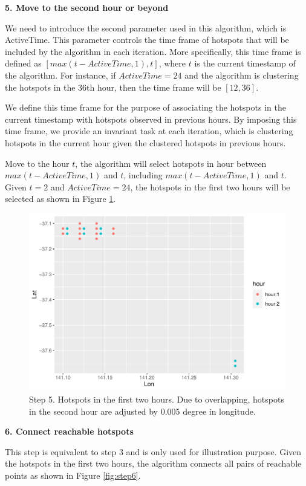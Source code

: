 \textbf{5. Move to the second hour or beyond}

We need to introduce the second parameter used in this algorithm, which
is ActiveTime. This parameter controls the time frame of hotspots that
will be included by the algorithm in each iteration. More specifically,
this time frame is defined as \([max(t-ActiveTime,1),t]\), where \(t\)
is the current timestamp of the algorithm. For instance, if
\(ActiveTime = 24\) and the algorithm is clustering the hotspots in the
36th hour, then the time frame will be \([12,36]\).

We define this time frame for the purpose of associating the hotspots in
the current timestamp with hotspots observed in previous hours. By
imposing this time frame, we provide an invariant task at each
iteration, which is clustering hotspots in the current hour given the
clustered hotspots in previous hours.

Move to the hour \(t\), the algorithm will select hotspots in hour
between \(max(t-ActiveTime,1)\) and \(t\), including
\(max(t-ActiveTime,1)\) and \(t\). Given \(t = 2\) and
\(ActiveTime = 24\), the hotspots in the first two hours will be
selected as shown in Figure \ref{fig:step5}.

\begin{Schunk}
\begin{figure}
\includegraphics[width=0.8\linewidth]{clustering_paper_files/figure-latex/step5-1} \caption[Step 5]{Step 5. Hotspots in the first two hours. Due to overlapping, hotspots in the second hour are adjusted by 0.005 degree in longitude.}\label{fig:step5}
\end{figure}
\end{Schunk}

\textbf{6. Connect reachable hotspots}

This step is equivalent to step 3 and is only used for illustration
purpose. Given the hotspots in the first two hours, the algorithm
connects all pairs of reachable points as shown in Figure
\ref{fig:step6}.


